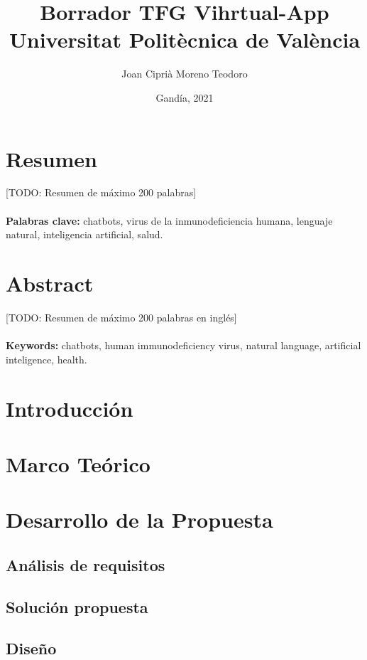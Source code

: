 \documentclass[11pt,a4paper]{book}
\title{
{Borrador TFG Vihrtual-App}\\
{\large Universitat Politècnica de València}\\
}
\author{Joan Ciprià Moreno Teodoro}
\date{Gandía, 2021}
\begin{document}
\maketitle

\chapter*{Resumen}
[TODO: Resumen de máximo 200 palabras]
\\
\\
\textbf{Palabras clave:} chatbots, virus de la inmunodeficiencia humana, lenguaje natural, inteligencia artificial, salud.

\chapter*{Abstract}
[TODO: Resumen de máximo 200 palabras en inglés]
\\
\\
\textbf{Keywords:} chatbots, human immunodeficiency virus, natural language, artificial inteligence, health. 

\tableofcontents

\chapter{Introducción}


\chapter{Marco Teórico}


\chapter{Desarrollo de la Propuesta}

\section{Análisis de requisitos}


\section{Solución propuesta}


\section{Diseño}

\end{document}
